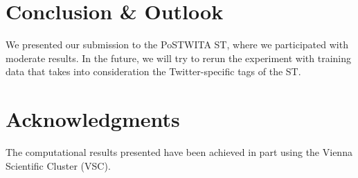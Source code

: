 \documentclass[11pt]{article}
\begin{document}
\section{Conclusion \& Outlook} %
\label{sec:conclusion}

We presented our submission to the PoSTWITA ST, where we participated
with moderate results. 
In the future, we will try to rerun the experiment with training data that
takes into consideration the Twitter-specific tags of the ST.


\section*{Acknowledgments} %

The computational results presented have been achieved in part using the Vienna
Scientific Cluster (VSC).





\end{document}

